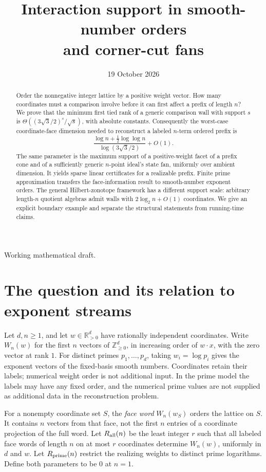 \documentclass[11pt,a4paper]{article}
\title{Interaction support in smooth-number orders\\and corner-cut fans}
\author{}
\date{19 October 2026}
\theoremstyle{remark}\newtheorem{remark}[theorem]{Remark}
\newcommand{\NN}{\mathbb Z_{\geq0}}
\newcommand{\RR}{\mathbb R}
\begin{document}
\maketitle
\begin{center}\small Working mathematical draft.\end{center}
\begin{abstract}
Order the nonnegative integer lattice by a positive weight vector.
How many coordinates must a comparison involve before it can first
affect a prefix of length \(n\)? We prove that the minimum first tied
rank of a generic comparison wall with support \(s\) is
\(\Theta((3\sqrt3/2)^s/\sqrt{s})\), with absolute constants.
Consequently the worst-case coordinate-face dimension needed to
reconstruct a labeled \(n\)-term ordered prefix is
\[
 \frac{\log n+\tfrac12\log\log n}{\log(3\sqrt3/2)}+O(1).
\]
The same parameter is the maximum support of a positive-weight facet
of a prefix cone and of a sufficiently generic \(n\)-point ideal's
state fan, uniformly over ambient dimension. It yields sparse linear
certificates for a realizable prefix. Finite prime approximation
transfers the face-information result to smooth-number exponent
orders. The general Hilbert-zonotope framework has a different
support scale: arbitrary length-\(n\) quotient algebras admit walls
with \(2\log_2 n+O(1)\) coordinates. We give an explicit boundary
example and separate the structural statements from running-time
claims.
\end{abstract}

\section{The question and its relation to exponent streams}
Let \(d,n\geq1\), and let \(w\in\RR_{>0}^d\) have rationally independent coordinates.
Write \(W_n(w)\) for the first \(n\) vectors of \(\NN^d\), in increasing
order of \(w\cdot x\), with the zero vector at rank \(1\).
For distinct primes \(p_1,\ldots,p_d\), taking \(w_i=\log p_i\)
gives the exponent vectors of the fixed-basis smooth numbers.
Coordinates retain their labels; numerical weight order is not
additional input. In the prime model the labels may have any fixed
order, and the numerical prime values are not supplied as additional
data in the reconstruction problem.

For a nonempty coordinate set \(S\), the \emph{face word}
\(W_n(w_S)\) orders the lattice on \(S\). It contains \(n\) vectors
from that face, not the first \(n\) entries of a coordinate projection
of the full word. Let \(R_{\rm all}(n)\) be the least integer \(r\)
such that all labeled face words of length \(n\) on at most \(r\)
coordinates determine \(W_n(w)\), uniformly in \(d\) and \(w\).
Let \(R_{\rm prime}(n)\) restrict the realizing weights to distinct
prime logarithms. Define both parameters to be \(0\) at \(n=1\).
\end{document}
